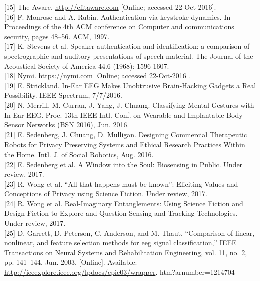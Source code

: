 \documentclass[11pt]{article}
\begin{document}
[15] The Aware. \url{http://efitaware.com} [Online; accessed 22-Oct-2016].
\hspace{0pt} \\

[16] F. Monrose and A. Rubin. Authentication via keystroke dynamics. In Proceedings of the 4th
ACM conference on Computer and communications security, pages 48–56. ACM, 1997.
\hspace{0pt} \\

[17]
K. Stevens et al. Speaker authentication and identification: a comparison of spectrographic
and auditory presentations of speech material. The Journal of the Acoustical Society of
America 44.6 (1968): 1596-1607.
\hspace{0pt} \\

[18] Nymi. \url{https://nymi.com} [Online; accessed 22-Oct-2016].
\hspace{0pt} \\

[19] E. Strickland. In-Ear EEG Makes Unobtrusive Brain-Hacking Gadgets a Real Possibility.
IEEE Spectrum, 7/7/2016.
\hspace{0pt} \\

[20]
N. Merrill, M. Curran, J. Yang, J. Chuang. Classifying Mental Gestures with In-Ear EEG.
Proc. 13th IEEE Intl. Conf. on Wearable and Implantable Body Sensor Networks (BSN
2016), Jun. 2016.
\hspace{0pt} \\

[21]
E. Sedenberg, J. Chuang, D. Mulligan. Designing Commercial Therapeutic Robots for
Privacy Preserving Systems and Ethical Research Practices Within the Home. Intl. J. of
Social Robotics, Aug. 2016.
\hspace{0pt} \\

[22] E. Sedenberg et al. A Window into the Soul: Biosensing in Public. Under review, 2017.
\hspace{0pt} \\

[23] R. Wong et al. “All that happens must be known”: Eliciting Values and Conceptions of
Privacy using Science Fiction. Under review, 2017.
\hspace{0pt} \\

[24]
R. Wong et al. Real-Imaginary Entanglements: Using Science Fiction and Design Fiction to
Explore and Question Sensing and Tracking Technologies. Under review, 2017.
\hspace{0pt} \\

[25] D. Garrett, D. Peterson, C. Anderson, and M. Thaut, “Comparison
of linear, nonlinear, and feature selection methods for eeg
signal classification,” IEEE Transactions on Neural Systems and
Rehabilitation Engineering, vol. 11, no. 2, pp. 141–144, Jun. 2003.
[Online]. Available: \url{http://ieeexplore.ieee.org/lpdocs/epic03/wrapper}.
htm?arnumber=1214704
\hspace{0pt} \\
\end{document}
